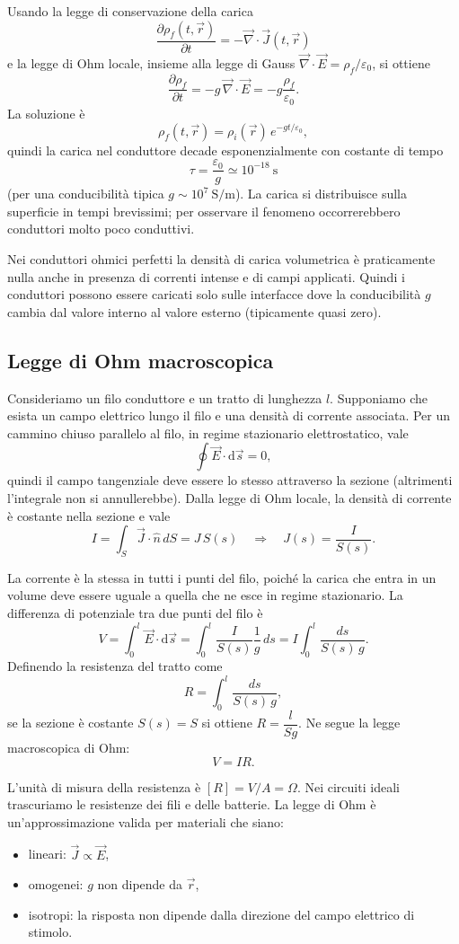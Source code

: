\documentclass{book}
\begin{document}
Usando la legge di conservazione della carica
\[
\frac{\partial \rho_f(t,\vec{r})}{\partial t} = -\vec{\nabla}\cdot\vec{J}(t,\vec{r})
\]
e la legge di Ohm locale, insieme alla legge di Gauss \(\vec{\nabla}\cdot\vec{E}=\rho_f/\varepsilon_0\), si ottiene
\[
\frac{\partial \rho_f}{\partial t} = -g\,\vec{\nabla}\cdot\vec{E} = -g\frac{\rho_f}{\varepsilon_0}.
\]
La soluzione è
\[
\rho_f(t,\vec{r}) = \rho_i(\vec{r})\,e^{-gt/\varepsilon_0},
\]
quindi la carica nel conduttore decade esponenzialmente con costante di tempo
\[
\tau=\frac{\varepsilon_0}{g}\simeq 10^{-18}\ \mathrm{s}
\]
(per una conducibilità tipica \(g\sim 10^7\ \mathrm{S/m}\)). La carica si distribuisce sulla superficie in tempi brevissimi; per osservare il fenomeno occorrerebbero conduttori molto poco conduttivi.

Nei conduttori ohmici perfetti la densità di carica volumetrica è praticamente nulla anche in presenza di correnti intense e di campi applicati. Quindi i conduttori possono essere caricati solo sulle interfacce dove la conducibilità \(g\) cambia dal valore interno al valore esterno (tipicamente quasi zero).

\subsection{Legge di Ohm macroscopica}
Consideriamo un filo conduttore e un tratto di lunghezza \(l\). Supponiamo che esista un campo elettrico lungo il filo e una densità di corrente associata. Per un cammino chiuso parallelo al filo, in regime stazionario elettrostatico, vale
\[
\oint \vec{E}\cdot\mathrm{d}\vec{s}=0,
\]
quindi il campo tangenziale deve essere lo stesso attraverso la sezione (altrimenti l'integrale non si annullerebbe). Dalla legge di Ohm locale, la densità di corrente è costante nella sezione e vale
\[
I=\int_S \vec{J}\cdot\hat{n}\,dS = J\,S(s) \quad\Rightarrow\quad J(s)=\frac{I}{S(s)}.
\]

La corrente è la stessa in tutti i punti del filo, poiché la carica che entra in un volume deve essere uguale a quella che ne esce in regime stazionario. La differenza di potenziale tra due punti del filo è
\[
V=\int_0^l \vec{E}\cdot\mathrm{d}\vec{s} = \int_0^l \frac{I}{S(s)}\frac{1}{g}\,ds = I\int_0^l \frac{ds}{S(s)\,g}.
\]
Definendo la resistenza del tratto come
\[
R=\int_0^l \frac{ds}{S(s)\,g},
\]
se la sezione è costante \(S(s)=S\) si ottiene \(R=\dfrac{l}{Sg}\). Ne segue la legge macroscopica di Ohm:
\[
V=IR.
\]

L'unità di misura della resistenza è \([R]=V/A=\Omega\). Nei circuiti ideali trascuriamo le resistenze dei fili e delle batterie. La legge di Ohm è un'approssimazione valida per materiali che siano:
\begin{itemize}
    \item lineari: \(\vec{J}\propto\vec{E}\),
    \item omogenei: \(g\) non dipende da \(\vec{r}\),
    \item isotropi: la risposta non dipende dalla direzione del campo elettrico di stimolo.
\end{itemize}
\end{document}

